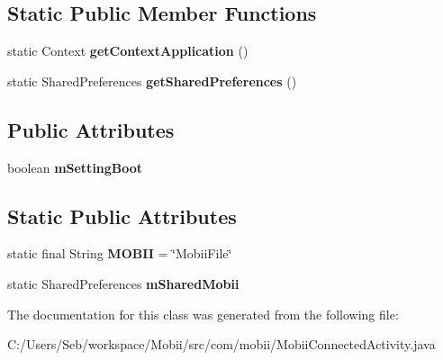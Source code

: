 \subsection*{Static Public Member Functions}
\begin{DoxyCompactItemize}
\item 
\hypertarget{classcom_1_1mobii_1_1_mobii_connected_activity_aacce34e668031cacf604a4fc5aff8478}{static Context {\bfseries get\-Context\-Application} ()}\label{classcom_1_1mobii_1_1_mobii_connected_activity_aacce34e668031cacf604a4fc5aff8478}

\item 
\hypertarget{classcom_1_1mobii_1_1_mobii_connected_activity_a7035ae01f3d9476280aaa5149c3c0f72}{static Shared\-Preferences {\bfseries get\-Shared\-Preferences} ()}\label{classcom_1_1mobii_1_1_mobii_connected_activity_a7035ae01f3d9476280aaa5149c3c0f72}

\end{DoxyCompactItemize}
\subsection*{Public Attributes}
\begin{DoxyCompactItemize}
\item 
\hypertarget{classcom_1_1mobii_1_1_mobii_connected_activity_ace40c2faef22b56419bb692ea2377b1a}{boolean {\bfseries m\-Setting\-Boot}}\label{classcom_1_1mobii_1_1_mobii_connected_activity_ace40c2faef22b56419bb692ea2377b1a}

\end{DoxyCompactItemize}
\subsection*{Static Public Attributes}
\begin{DoxyCompactItemize}
\item 
\hypertarget{classcom_1_1mobii_1_1_mobii_connected_activity_aa552a21a815f2ddd038282e18a79bd34}{static final String {\bfseries M\-O\-B\-I\-I} = \char`\"{}Mobii\-File\char`\"{}}\label{classcom_1_1mobii_1_1_mobii_connected_activity_aa552a21a815f2ddd038282e18a79bd34}

\item 
\hypertarget{classcom_1_1mobii_1_1_mobii_connected_activity_a5b3be729922012b5f7587e5ef0c3a59d}{static Shared\-Preferences {\bfseries m\-Shared\-Mobii}}\label{classcom_1_1mobii_1_1_mobii_connected_activity_a5b3be729922012b5f7587e5ef0c3a59d}

\end{DoxyCompactItemize}


The documentation for this class was generated from the following file\-:\begin{DoxyCompactItemize}
\item 
C\-:/\-Users/\-Seb/workspace/\-Mobii/src/com/mobii/Mobii\-Connected\-Activity.\-java\end{DoxyCompactItemize}

